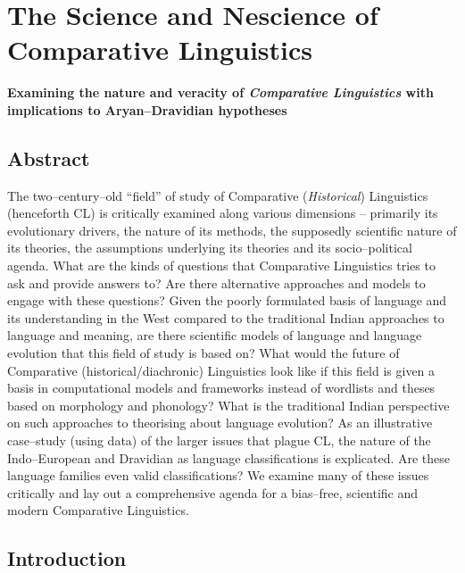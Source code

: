 
\chapter{The Science and Nescience of Comparative Linguistics}\label{chap06}

\begin{center}
\textbf{Examining the nature and veracity of \textit{Comparative Linguistics} with implications to Aryan–Dravidian hypotheses}
\end{center}



\section*{Abstract}

The two–century–old “field” of study of Comparative (\textit{Historical}) Linguistics (henceforth CL) is critically examined along various dimensions – primarily its evolutionary drivers, the nature of its methods, the supposedly scientific nature of its theories, the assumptions underlying its theories and its socio–political agenda. What are the kinds of questions that Comparative Linguistics tries to ask and provide answers to? Are there alternative approaches and models to engage with these questions? Given the poorly formulated basis of language and its understanding in the West compared to the traditional Indian approaches to language and meaning, are there scientific models of language and language evolution that this field of study is based on? What would the future of Comparative (historical/diachronic) Linguistics look like if this field is given a basis in computational models and frameworks instead of wordlists and theses based on morphology and phonology? What is the traditional Indian perspective on such approaches to theorising about language evolution? As an illustrative case–study (using data) of the larger issues that plague CL, the nature of the Indo–European and Dravidian as language classifications is explicated. Are these language families even valid classifications? We examine many of these issues critically and lay out a comprehensive agenda for a bias–free, scientific and modern Comparative Linguistics.


\section*{Introduction}

